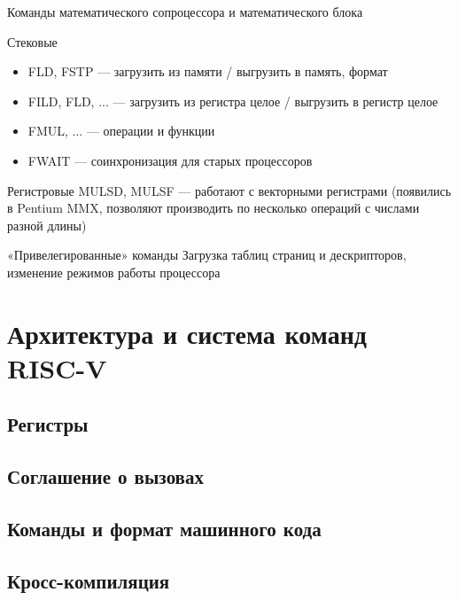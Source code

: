 \documentclass[xetex,aspectratio=43]{beamer}
\begin{document}
\begin{frame}{Команды математического сопроцессора и математического блока}
    \begin{block}{Стековые}
        \begin{itemize}
        \tightlist
        \item
        FLD, FSTP --- загрузить из памяти / выгрузить в память, формат
        \item
        FILD, FLD, ... --- загрузить из регистра целое / выгрузить в регистр целое
        \item
        FMUL, ... --- операции и функции
        \item
        FWAIT --- соинхронизация для старых процессоров
        \end{itemize}
    \end{block}
    \begin{block}{Регистровые}
        MULSD, MULSF --- работают с векторными регистрами (появились в Pentium MMX, позволяют производить по несколько операций с числами разной длины)
    \end{block}
\end{frame}

\begin{frame}{«Привелегированные» команды}
        Загрузка таблиц страниц и дескрипторов, изменение режимов работы
        процессора
\end{frame}


\section{Архитектура и система команд RISC-V}

\subsection{Регистры}

\subsection{Соглашение о вызовах}

\subsection{Команды и формат машинного кода}

\subsection{Кросс-компиляция}
\end{document}
